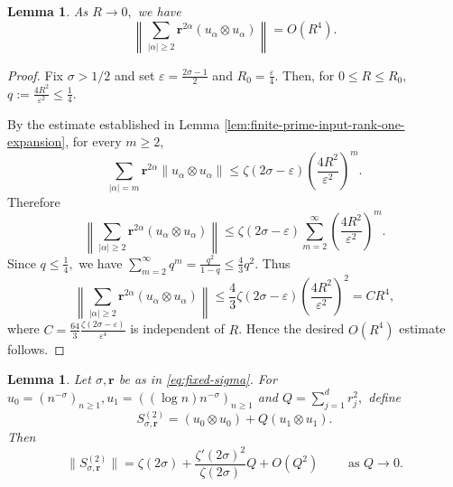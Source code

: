 \documentclass[12pt, reqno]{amsart}
\numberwithin{equation}{section}
\newtheorem{lemma}[theorem]{Lemma}
\begin{document}
\begin{lemma}
\label{lem:finite-prime-tail-beyond-degree-one}
As $R\to 0,$  we have
\[
\left\|
\sum_{|\alpha|\geq 2}
\boldsymbol{r}^{2\alpha}(u_{\alpha}\otimes u_{\alpha})
\right\|
= O(R^4).
\]
\end{lemma}

\begin{proof}
Fix $\sigma
>1/2$ and set $\varepsilon=\frac{2\sigma-1}{2}$  and $R_0=\frac{\varepsilon}{4}.$ Then, for  $0\leq R\leq R_0,$   $q:=\frac{4R^2}{\varepsilon^2}\leq \frac{1}{4}.$

By the estimate established in Lemma  \ref{lem:finite-prime-input-rank-one-expansion}, for every $m\ge2$,
\[
\sum_{|\alpha|=m}
\boldsymbol{r}^{2\alpha}\|u_{\alpha}\otimes u_{\alpha}\|
\leq
\zeta(2\sigma-\varepsilon)
\left(\frac{4R^2}{\varepsilon^2}\right)^m.
\]
Therefore
\[
\left\|
\sum_{|\alpha|\geq 2}
\boldsymbol{r}^{2\alpha}(u_{\alpha}\otimes u_{\alpha})
\right\|
\leq
\zeta(2\sigma-\varepsilon)
\sum_{m=2}^{\infty}
\left(\frac{4R^2}{\varepsilon^2}\right)^m.
\]
Since $q\leq \frac{1}{4},$
we have $ \sum_{m=2}^{\infty}q^m = \frac{q^2}{1-q} \leq \frac{4}{3}q^2.$
Thus
\[
\left\|
\sum_{|\alpha|\geq 2}
\boldsymbol{r}^{2\alpha}(u_{\alpha}\otimes u_{\alpha})
\right\|
\leq
\frac{4}{3}\zeta(2\sigma-\varepsilon)
\left(\frac{4R^2}{\varepsilon^2}\right)^2=CR^4,
\]
where
$C = \frac{64}{3}\frac{\zeta(2\sigma-\varepsilon)}{\varepsilon^4}$
is independent of $R$. Hence the desired $O(R^4)$ estimate follows.


\end{proof}

\begin{lemma}
\label{lem:finite-prime-rank-two-calculation}
Let $\sigma,\boldsymbol{r}$ be as in \eqref{eq:fixed-sigma}.
For $u_0=(n^{-\sigma})_{n\geq 1},u_1=((\log n)n^{-\sigma})_{n\geq 1}$  and $Q=\sum_{j=1}^{d}r_j^2,$ define
\[
S_{\sigma,\boldsymbol{r}}^{(2)}
=
(u_0\otimes u_0)+Q(u_1\otimes u_1).
\]
Then
\[
\|S_{\sigma,\boldsymbol{r}}^{(2)}\|
=
\zeta(2\sigma)
+
\frac{\zeta'(2\sigma)^2}{\zeta(2\sigma)}Q
+
O(Q^2) \qquad \text{ as } Q\to 0.
\]
\end{lemma}
\end{document}
